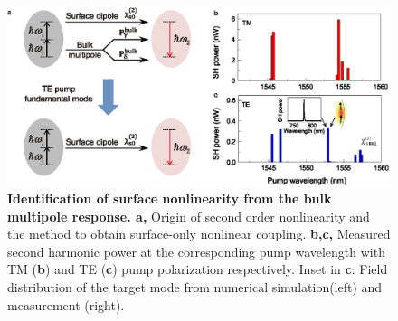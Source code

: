 \documentclass[a4paper,8pt,hyperref, twocolumn]{article}
\begin{document}



\begin{figure}[!ht]
\centering
\includegraphics[width=16cm]{Fig3new.eps}
\caption{\textbf{Identification of surface nonlinearity from the bulk multipole response. a, }Origin of second order nonlinearity and the method to obtain surface-only nonlinear coupling. \textbf{b,c,} Measured second harmonic power at the corresponding pump wavelength with TM (\textbf{b}) and TE (\textbf{c}) pump polarization respectively. Inset in \textbf{c}: Field distribution of the target mode from numerical simulation(left) and measurement (right).}
\label{pic:Fig3}
\end{figure}
\end{document}
